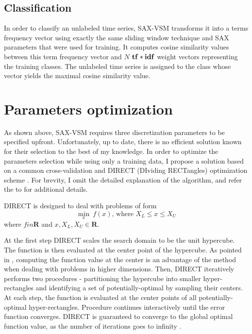 \subsection{Classification}
In order to classify an unlabeled time series, SAX-VSM transforms it into a
terms frequency vector using exactly the same sliding window technique 
and SAX parameters that were used for training. 
It computes cosine similarity values between this term frequency vector 
and $N$ $\text{\textbf{tf}}\ast\text{\textbf{idf}}$ weight vectors representing the 
training classes. The unlabeled time series is assigned to the class whose vector yields the
maximal cosine similarity value.

\section{Parameters optimization} \label{section-direct}
As shown above, SAX-VSM requires three discretization parameters to be specified upfront. 
Unfortunately, up to date, there is no efficient solution known for their selection to the best 
of my knowledge. In order to optimize the parameters selection while using only a training data, 
I propose a solution based on a common cross-validation and DIRECT (DIviding RECTangles) 
optimization scheme \cite{citeulike:4210208}. For brevity, I omit the detailed explanation 
of the algorithm, and refer the to \cite{citeulike:12563460} for additional details.

DIRECT is designed to deal with problems of form
\begin{equation}
 \min_{x} \: f(x) \text{, where } X_{L} \leq x \leq X_{U}
 \label{formula:direct}
\end{equation} 
where $f in \mathbf{R}$ and $x, X_{L}, X_{U} \in \mathbf{R}$. 

At the first step DIRECT scales the search domain to be the unit hypercube. The function is then evaluated 
at the center point of the hypercube. As pointed in \cite{citeulike:12563460}, computing the function value
at
the center is an advantage of the method when dealing with problems
in higher dimensions.
Then, DIRECT iteratively performs two procedures - partitioning the hypercube into smaller hyper-rectangles 
and identifying a set of potentially-optimal by sampling their centers. At each step, the function is evaluated 
at the center points of all potentially-optimal hyper-rectangles. Procedure continues interactively until the 
error function converges. DIRECT is guaranteed to converge to the global optimal function value,
as the number 
of iterations goes to infinity \cite{citeulike:12563460}.


